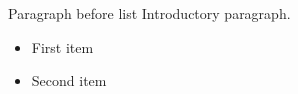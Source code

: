 \documentclass[14pt,t]{beamer}
\begin{document}
\begin{frame}{Paragraph before list}
Introductory paragraph.

\begin{itemize}
\item First item
\item Second item
\end{itemize}
\end{frame}
\end{document}

